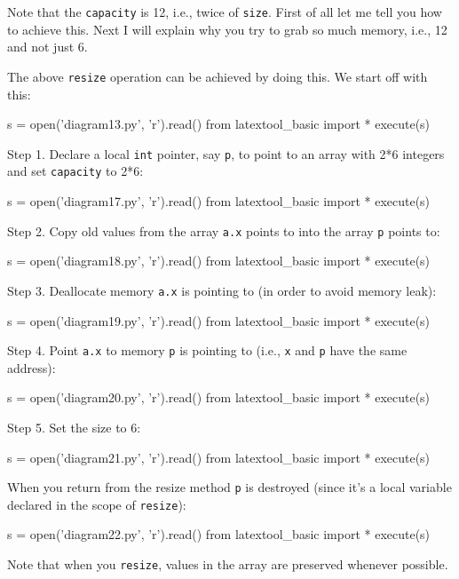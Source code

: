 Note that the \verb!capacity! is 12,
i.e., twice of \verb!size!.
First of all 
let me tell you how to achieve this.
Next I will explain why you try to grab 
so much memory, i.e., 12 and not just 6.

The above \verb!resize!
operation can be achieved by doing this.
We start off with this:
\begin{python}
s = open('diagram13.py', 'r').read()
from latextool_basic import *
execute(s)
\end{python}


Step 1.
Declare a local \verb!int! pointer, say \verb!p!,
to point to an array with
2*6 integers and set 
\verb!capacity! to 2*6: 
\begin{python}
s = open('diagram17.py', 'r').read()
from latextool_basic import *
execute(s)
\end{python}

Step 2.
Copy old values
from the array \verb!a.x! points to
into the array \verb!p! points to: 
\begin{python}
s = open('diagram18.py', 'r').read()
from latextool_basic import *
execute(s)
\end{python}

Step 3.
Deallocate memory \verb!a.x! is pointing to (in order to avoid memory leak): 
\begin{python}
s = open('diagram19.py', 'r').read()
from latextool_basic import *
execute(s)
\end{python}

Step 4.
Point \verb!a.x! to memory \verb!p! is pointing to (i.e., \verb!x! and \verb!p! 
have the same address): 
\begin{python}
s = open('diagram20.py', 'r').read()
from latextool_basic import *
execute(s)
\end{python}

Step 5.
Set the size to 6:
\begin{python}
s = open('diagram21.py', 'r').read()
from latextool_basic import *
execute(s)
\end{python}

When you return from the resize method \verb!p! is destroyed (since
it's a local variable declared in the scope of \verb!resize!):
\begin{python}
s = open('diagram22.py', 'r').read()
from latextool_basic import *
execute(s)
\end{python}

Note that when you \verb!resize!, values in the array are preserved whenever 
possible.

